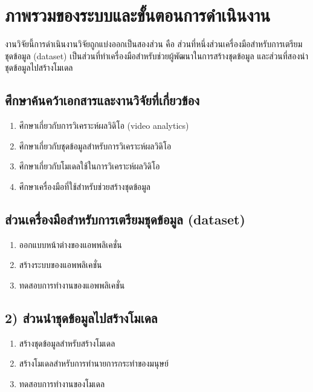 \section{ภาพรวมของระบบและขั้นตอนการดำเนินงาน}
งานวิจัยนี้การดำเนินงานวิจัยถูกแบ่งออกเป็นสองส่วน คือ ส่วนที่หนึ่งส่วนเครื่องมือสำหรับการเตรียมชุดข้อมูล (dataset) เป็นส่วนที่ทำเครื่องมือสำหรับช่วยผู้พัฒนาในการสร้างชุดข้อมูล และส่วนที่สองนำชุดข้อมูลไปสร้างโมเดล
\subsection*{ศึกษาค้นคว้าเอกสารและงานวิจัยที่เกี่ยวข้อง}
\begin{enumerate}\setlength\itemsep{-0.25em}
	\item ศึกษาเกี่ยวกับการวิเคราะห์ผลวิดิโอ (video analytics)
	\item ศึกษาเกี่ยวกับชุดข้อมูลสำหรับการวิเคราะห์ผลวิดิโอ
	\item ศึกษาเกี่ยวกับโมเดลใช้ในการวิเคราะห์ผลวิดิโอ
	\item ศึกษาเครื่องมือที่ใช้สำหรับช่วยสร้างชุดข้อมูล
\end{enumerate}
\subsection*{ส่วนเครื่องมือสำหรับการเตรียมชุดข้อมูล (dataset)}
\begin{enumerate}\setlength\itemsep{-0.25em}
	\item ออกแบบหน้าต่างของแอพพลิเคชั่น
	\item สร้างระบบของแอพพลิเคชั่น
	\item ทดสอบการทำงานของแอพพลิเคชั่น
\end{enumerate}
\subsection*{2) ส่วนนำชุดข้อมูลไปสร้างโมเดล}
\begin{enumerate}\setlength\itemsep{-0.25em}
	\item สร้างชุดข้อมูลสำหรับสร้างโมเดล
	\item สร้างโมเดลสำหรับการทำนายการกระทำของมนุษย์
	\item ทดสอบการทำงานของโมเดล
\end{enumerate}
\clearpage
